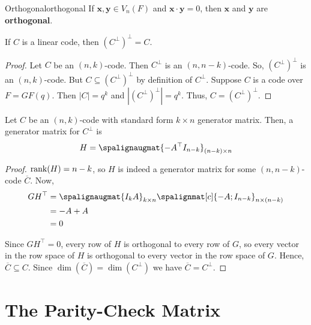 
\begin{Definition}{Orthogonal}{orthogonal}
    If $ \bm{x},\bm{y}\in V_n(F) $ and $ \bm{x}\cdot \bm{y}=0 $, then
    $ \bm{x} $ and $ \bm{y} $ are \textbf{orthogonal}.
\end{Definition}

\begin{Theorem}{}{}
    If $ C $ is a linear code, then $ (C^{\perp})^{\perp}=C $.
\end{Theorem}

\begin{proof}
    Let $ C $ be an $ (n,k) $-code. Then $ C^{\perp} $ is an $ (n,n-k) $-code.
    So, $ (C^{\perp})^{\perp} $ is an $ (n,k) $-code. But
    $ C\subseteq (C^{\perp})^{\perp} $ by definition of $ C^{\perp} $.
    Suppose $ C $ is a code over $ F=GF(q) $. Then $ |C|=q^k $
    and $ |(C^{\perp})^{\perp}|=q^k $. Thus, $ C=(C^{\perp})^{\perp} $.
\end{proof}

\begin{Theorem}{}{}
    Let $ C $ be an $ (n,k) $-code with standard form $ k\times n $ generator matrix.
    Then, a generator matrix for $ C^{\perp} $ is
    \[ H=\spalignaugmat{-A^{\top} I_{n-k}}_{(n-k)\times n} \]
\end{Theorem}

\begin{proof}
    $ \operatorname{rank}(H)=n-k $, so $ H $ is indeed a generator matrix for some $ (n,n-k) $-code
    $ \overline{C} $. Now,
    \begin{align*}
        GH^{\top}
         & = \spalignaugmat{I_k A}_{k\times n}\spalignmat[c]{-A; I_{n-k}}_{n\times(n-k)} \\
         & =-A+A                                                                         \\
         & =0
    \end{align*}

    Since $ GH^{\top}=0 $, every row of $ H $ is orthogonal to every row of $ G $,
    so every vector in the row space of $ H $ is orthogonal to every vector in
    the row space of $ G $. Hence, $ \overline{C}\subseteq C $. Since
    $ \dim(\overline{C})=\dim(C^{\perp}) $ we have $ \overline{C}=C^{\perp} $.
\end{proof}

\section{The Parity-Check Matrix}

